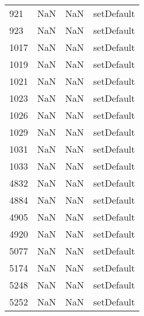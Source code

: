 \begin{tabular}{llll}
921  &                   NaN &                        NaN &                                setDefault \\
923  &                   NaN &                        NaN &                                setDefault \\
1017 &                   NaN &                        NaN &                                setDefault \\
1019 &                   NaN &                        NaN &                                setDefault \\
1021 &                   NaN &                        NaN &                                setDefault \\
1023 &                   NaN &                        NaN &                                setDefault \\
1026 &                   NaN &                        NaN &                                setDefault \\
1029 &                   NaN &                        NaN &                                setDefault \\
1031 &                   NaN &                        NaN &                                setDefault \\
1033 &                   NaN &                        NaN &                                setDefault \\
4832 &                   NaN &                        NaN &                                setDefault \\
4884 &                   NaN &                        NaN &                                setDefault \\
4905 &                   NaN &                        NaN &                                setDefault \\
4920 &                   NaN &                        NaN &                                setDefault \\
5077 &                   NaN &                        NaN &                                setDefault \\
5174 &                   NaN &                        NaN &                                setDefault \\
5248 &                   NaN &                        NaN &                                setDefault \\
5252 &                   NaN &                        NaN &                                setDefault \\

\end{tabular}
